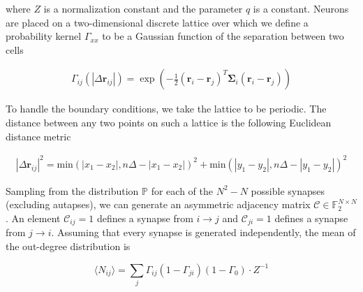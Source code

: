 \documentclass{ucetd}
\begin{document}
where $Z$ is a normalization constant and the parameter $q$ is a constant. Neurons are placed on a two-dimensional discrete lattice over which we define a probability kernel $\Gamma_{xx}$ to be a Gaussian function of the separation between two cells

\begin{align}
\Gamma_{ij}(|\Delta\mathbf{r}_{ij}|) = \exp\left(-\frac{1}{2}(\mathbf{r}_{i}-\mathbf{r}_{j})^{T}\mathbf{\Sigma}_{i}(\mathbf{r}_{i}-\mathbf{r}_{j})\right)
\end{align}

To handle the boundary conditions, we take the lattice to be periodic. The distance between any two points on such a lattice is the following Euclidean distance metric

\begin{align*}
|\Delta\mathbf{r}_{ij}|^{2} = \mathrm{min}(|x_1 - x_2|, n\Delta - |x_1 - x_2|)^2 + \mathrm{min}(|y_1 - y_2|, n\Delta - |y_1 - y_2|)^2
\end{align*}


Sampling from the distribution $\mathbb{P}$ for each of the $N^{2} - N$ possible synapses (excluding autapses), we can generate an asymmetric adjacency matrix $\mathcal{C} \in \mathbb{F}_{2}^{N\times N}$. An element $\mathcal{C}_{ij} = 1$ defines a synapse from $i\rightarrow j$ and $\mathcal{C}_{ji} = 1$ defines a synapse from $j\rightarrow i$. Assuming that every synapse is generated independently, the mean of the out-degree distribution is

\begin{equation}
\langle N_{ij} \rangle = \sum_{j} \Gamma_{ij}(1-\Gamma_{ji})(1-\Gamma_{0})\cdot Z^{-1}
\end{equation}
\end{document}
